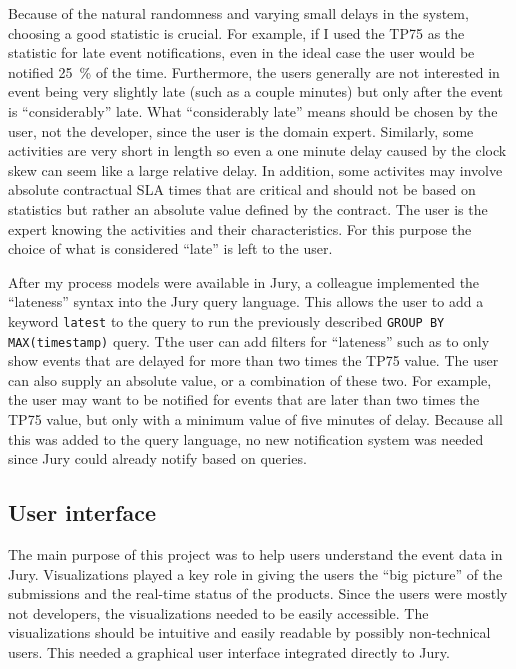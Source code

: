 Because of the natural randomness and varying small delays in the system, choosing a good statistic is crucial. 
For example, if I used the TP75 as the statistic for late event notifications, even in the ideal case the user would be notified 25~\% of the time.
Furthermore, the users generally are not interested in event being very slightly late (such as a couple minutes) but only after the event is ``considerably'' late.
What ``considerably late'' means should be chosen by the user, not the developer, since the user is the domain expert.
Similarly, some activities are very short in length so even a one minute delay caused by the clock skew can seem like a large relative delay.
In addition, some activites may involve absolute contractual SLA times that are critical and should not be based on statistics but rather an absolute value defined by the contract.
The user is the expert knowing the activities and their characteristics.
For this purpose the choice of what is considered ``late'' is left to the user.

After my process models were available in Jury, a colleague implemented the ``lateness'' syntax into the Jury query language. 
This allows the user to add a keyword \texttt{latest} to the query to run the previously described \texttt{GROUP BY MAX(timestamp)} query.
Tthe user can add filters for ``lateness'' such as to only show events that are delayed for more than two times the TP75 value.
The user can also supply an absolute value, or a combination of these two.
For example, the user may want to be notified for events that are later than two times the TP75 value, but only with a minimum value of five minutes of delay.
Because all this was added to the query language, no new notification system was needed since Jury could already notify based on queries.

\subsection{User interface}

The main purpose of this project was to help users understand the event data in Jury.
Visualizations played a key role in giving the users the ``big picture'' of the submissions and the real-time status of the products.
Since the users were mostly not developers, the visualizations needed to be easily accessible.
The visualizations should be intuitive and easily readable by possibly non-technical users.
This needed a graphical user interface integrated directly to Jury.

